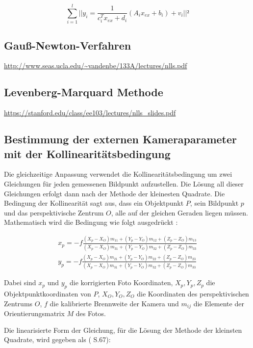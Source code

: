 \begin{equation}
\sum_{i=1}^l || y_i = \frac{1}{c_i^T x_{ex}+d_i}(A_i x_{ex} + b_i) + v_i||²
\end{equation}

\subsection{Gauß-Newton-Verfahren}

\url{http://www.seas.ucla.edu/~vandenbe/133A/lectures/nlls.pdf}

\subsection{Levenberg-Marquard Methode}
 \url{https://stanford.edu/class/ee103/lectures/nlls_slides.pdf}


\subsection{Bestimmung der externen Kameraparameter mit der Kollinearitätsbedingung}

Die gleichzeitige Anpassung verwendet die Kollinearitätsbedingung  um zwei Gleichungen für jeden gemessenen Bildpunkt aufzustellen. Die Lösung all dieser Gleichungen erfolgt dann nach der Methode der kleinesten Quadrate. Die Bedingung der Kollinearität sagt aus, dass ein Objektpunkt $P$, sein Bildpunkt $p$ und das perspektivische Zentrum $O$, alle auf der gleichen Geraden liegen müssen. Mathematisch wird die Bedingung wie folgt ausgedrückt  \cite{coll_exterior}:

\begin{equation}
\begin{aligned}
  x_p = -f \frac{(X_p-X_O)m_{11}+(Y_p-Y_O)m_{12}+(Z_p-Z_O)m_{13}}{(X_p-X_O)m_{31}+(Y_p-Y_O)m_{32}+(Z_p-Z_O)m_{33}} \\
    y_p = -f \frac{(X_p-X_O)m_{21}+(Y_p-Y_O)m_{22}+(Z_p-Z_O)m_{23}}{(X_p-X_O)m_{31}+(Y_p-Y_O)m_{32}+(Z_p-Z_O)m_{33}}
\end{aligned}
\end{equation}

Dabei sind $x_p$ und $y_p$ die korrigierten Foto Koordinaten, $X_p,Y_p,Z_p$ die Objektpunktkoordinaten von $P$, $X_O,Y_O,Z_O$ die Koordinaten des perspektivischen Zentrums $O$, $f$ die kalibrierte Brennweite der Kamera und $m_{ij}$ die Elemente der Orientierungsmatrix $M$ des Fotos.

Die linearisierte Form der Gleichung, für die Lösung der Methode der kleinsten Quadrate, wird gegeben als (\cite{comparative_conditions_study} S.67):

